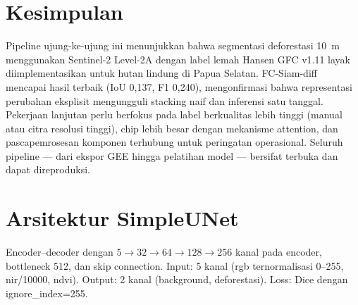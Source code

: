 \documentclass[10pt,a4paper,onecolumn]{article}
\begin{document}
\section{Kesimpulan}
Pipeline ujung-ke-ujung ini menunjukkan bahwa segmentasi deforestasi
10~m menggunakan Sentinel-2 Level-2A dengan label lemah Hansen GFC v1.11
layak diimplementasikan untuk hutan lindung di Papua Selatan. FC-Siam-diff
mencapai hasil terbaik (IoU 0,137, F1 0,240), mengonfirmasi bahwa
representasi perubahan eksplisit mengungguli stacking naif dan inferensi
satu tanggal. Pekerjaan lanjutan perlu berfokus pada label berkualitas
lebih tinggi (manual atau citra resolusi tinggi), chip lebih besar dengan
mekanisme attention, dan pascapemrosesan komponen terhubung untuk
peringatan operasional. Seluruh pipeline --- dari ekspor GEE hingga
pelatihan model --- bersifat terbuka dan dapat direproduksi.

\clearpage
\small
\renewcommand{\refname}{Daftar Pustaka}



\clearpage
\appendix
\section{Arsitektur SimpleUNet}
\label{app:arch}
Encoder--decoder dengan $5\to32\to64\to128\to256$ kanal pada encoder,
bottleneck 512, dan skip connection. Input: 5 kanal (rgb ternormalisasi
0--255, nir/10000, ndvi). Output: 2 kanal (background, deforestasi).
Loss: Dice dengan ignore\_index=255.
\end{document}
